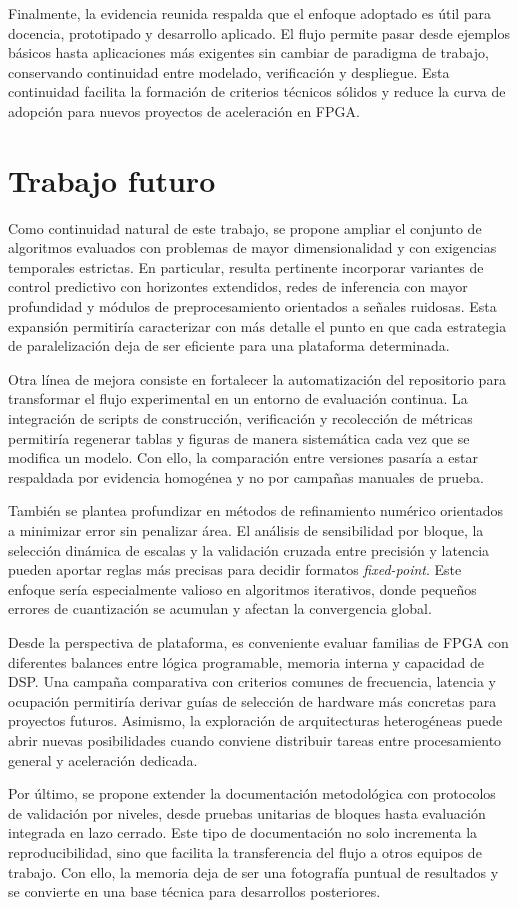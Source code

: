 Finalmente, la evidencia reunida respalda que el enfoque adoptado es útil para docencia, prototipado y desarrollo aplicado. El flujo permite pasar desde ejemplos básicos hasta aplicaciones más exigentes sin cambiar de paradigma de trabajo, conservando continuidad entre modelado, verificación y despliegue. Esta continuidad facilita la formación de criterios técnicos sólidos y reduce la curva de adopción para nuevos proyectos de aceleración en FPGA.

\section{Trabajo futuro}
Como continuidad natural de este trabajo, se propone ampliar el conjunto de algoritmos evaluados con problemas de mayor dimensionalidad y con exigencias temporales estrictas. En particular, resulta pertinente incorporar variantes de control predictivo con horizontes extendidos, redes de inferencia con mayor profundidad y módulos de preprocesamiento orientados a señales ruidosas. Esta expansión permitiría caracterizar con más detalle el punto en que cada estrategia de paralelización deja de ser eficiente para una plataforma determinada.

Otra línea de mejora consiste en fortalecer la automatización del repositorio para transformar el flujo experimental en un entorno de evaluación continua. La integración de scripts de construcción, verificación y recolección de métricas permitiría regenerar tablas y figuras de manera sistemática cada vez que se modifica un modelo. Con ello, la comparación entre versiones pasaría a estar respaldada por evidencia homogénea y no por campañas manuales de prueba.

También se plantea profundizar en métodos de refinamiento numérico orientados a minimizar error sin penalizar área. El análisis de sensibilidad por bloque, la selección dinámica de escalas y la validación cruzada entre precisión y latencia pueden aportar reglas más precisas para decidir formatos \textit{fixed-point}. Este enfoque sería especialmente valioso en algoritmos iterativos, donde pequeños errores de cuantización se acumulan y afectan la convergencia global.

Desde la perspectiva de plataforma, es conveniente evaluar familias de FPGA con diferentes balances entre lógica programable, memoria interna y capacidad de DSP. Una campaña comparativa con criterios comunes de frecuencia, latencia y ocupación permitiría derivar guías de selección de hardware más concretas para proyectos futuros. Asimismo, la exploración de arquitecturas heterogéneas puede abrir nuevas posibilidades cuando conviene distribuir tareas entre procesamiento general y aceleración dedicada.

Por último, se propone extender la documentación metodológica con protocolos de validación por niveles, desde pruebas unitarias de bloques hasta evaluación integrada en lazo cerrado. Este tipo de documentación no solo incrementa la reproducibilidad, sino que facilita la transferencia del flujo a otros equipos de trabajo. Con ello, la memoria deja de ser una fotografía puntual de resultados y se convierte en una base técnica para desarrollos posteriores.
